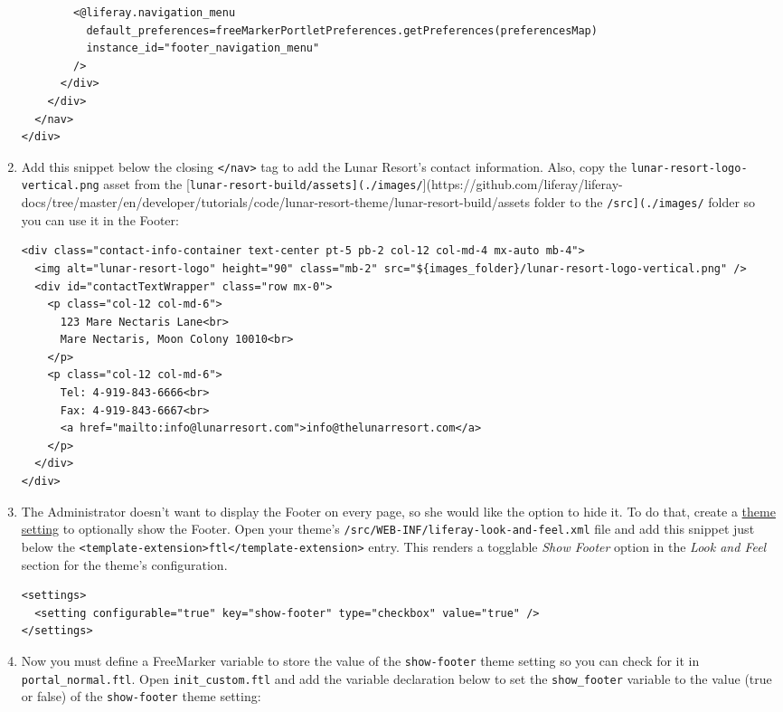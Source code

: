\begin{enumerate}
\begin{verbatim}
        <@liferay.navigation_menu
          default_preferences=freeMarkerPortletPreferences.getPreferences(preferencesMap)
          instance_id="footer_navigation_menu"
        />
      </div>
    </div>
  </nav>
</div>
\end{verbatim}
\item
  Add this snippet below the closing
  \texttt{\textless{}/nav\textgreater{}} tag to add the Lunar Resort's
  contact information. Also, copy the
  \texttt{lunar-resort-logo-vertical.png} asset from the
  {[}\texttt{lunar-resort-build/assets{]}(./images/}{]}(https://github.com/liferay/liferay-docs/tree/master/en/developer/tutorials/code/lunar-resort-theme/lunar-resort-build/assets
  folder to the \texttt{/src{]}(./images/} folder so you can use it in
  the Footer:

\begin{verbatim}
<div class="contact-info-container text-center pt-5 pb-2 col-12 col-md-4 mx-auto mb-4">
  <img alt="lunar-resort-logo" height="90" class="mb-2" src="${images_folder}/lunar-resort-logo-vertical.png" />
  <div id="contactTextWrapper" class="row mx-0">
    <p class="col-12 col-md-6">
      123 Mare Nectaris Lane<br>
      Mare Nectaris, Moon Colony 10010<br>
    </p>
    <p class="col-12 col-md-6">
      Tel: 4-919-843-6666<br>
      Fax: 4-919-843-6667<br>
      <a href="mailto:info@lunarresort.com">info@thelunarresort.com</a>
    </p>
  </div>
</div>
\end{verbatim}
\item
  The Administrator doesn't want to display the Footer on every page, so
  she would like the option to hide it. To do that, create a
  \href{/docs/7-2/frameworks/-/knowledge_base/f/making-configurable-theme-settings}{theme
  setting} to optionally show the Footer. Open your theme's
  \texttt{/src/WEB-INF/liferay-look-and-feel.xml} file and add this
  snippet just below the
  \texttt{\textless{}template-extension\textgreater{}ftl\textless{}/template-extension\textgreater{}}
  entry. This renders a togglable \emph{Show Footer} option in the
  \emph{Look and Feel} section for the theme's configuration.

\begin{verbatim}
<settings>
  <setting configurable="true" key="show-footer" type="checkbox" value="true" />
</settings>
\end{verbatim}
\item
  Now you must define a FreeMarker variable to store the value of the
  \texttt{show-footer} theme setting so you can check for it in
  \texttt{portal\_normal.ftl}. Open \texttt{init\_custom.ftl} and add
  the variable declaration below to set the \texttt{show\_footer}
  variable to the value (true or false) of the \texttt{show-footer}
  theme setting:


\end{enumerate}
